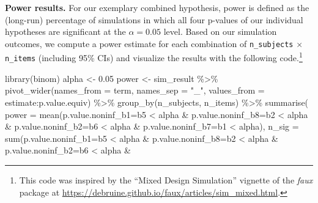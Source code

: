 \documentclass[
  man,
  floatsintext,
  longtable,
  a4paper,
  nolmodern,
  notxfonts,
  notimes,
  colorlinks=true,linkcolor=blue,citecolor=blue,urlcolor=blue]{apa7}
\newenvironment{Shaded}{\begin{snugshade}}{\end{snugshade}}
\newcommand{\AttributeTok}[1]{\textcolor[rgb]{0.40,0.45,0.13}{#1}}
\newcommand{\FloatTok}[1]{\textcolor[rgb]{0.68,0.00,0.00}{#1}}
\newcommand{\FunctionTok}[1]{\textcolor[rgb]{0.28,0.35,0.67}{#1}}
\newcommand{\NormalTok}[1]{\textcolor[rgb]{0.00,0.23,0.31}{#1}}
\newcommand{\OtherTok}[1]{\textcolor[rgb]{0.00,0.23,0.31}{#1}}
\newcommand{\SpecialCharTok}[1]{\textcolor[rgb]{0.37,0.37,0.37}{#1}}
\newcommand{\StringTok}[1]{\textcolor[rgb]{0.13,0.47,0.30}{#1}}
\begin{document}
\textbf{Power results.} For our exemplary combined hypothesis, power is
defined as the (long-run) percentage of simulations in which all four
p-values of our individual hypotheses are significant at the
\(\alpha = 0.05\) level. Based on our simulation outcomes, we compute a
power estimate for each combination of \texttt{n\_subjects} \(\times\)
\texttt{n\_items} (including 95\% CIs) and visualize the results with
the following code.\footnote{This code was inspired by the ``Mixed
  Design Simulation'' vignette of the \emph{faux} package at
  \url{https://debruine.github.io/faux/articles/sim_mixed.html}.}

\label{cell-fig-finalpwr}
\begin{Shaded}
\begin{Highlighting}[]
\FunctionTok{library}\NormalTok{(binom)}
\NormalTok{alpha }\OtherTok{\textless{}{-}} \FloatTok{0.05}
\NormalTok{power }\OtherTok{\textless{}{-}}\NormalTok{ sim\_result }\SpecialCharTok{\%\textgreater{}\%}
  \FunctionTok{pivot\_wider}\NormalTok{(}\AttributeTok{names\_from =}\NormalTok{ term, }\AttributeTok{names\_sep =} \StringTok{"\_"}\NormalTok{, }
    \AttributeTok{values\_from =}\NormalTok{ estimate}\SpecialCharTok{:}\NormalTok{p.value.equiv) }\SpecialCharTok{\%\textgreater{}\%}
  \FunctionTok{group\_by}\NormalTok{(n\_subjects, n\_items) }\SpecialCharTok{\%\textgreater{}\%} 
  \FunctionTok{summarise}\NormalTok{(}
    \AttributeTok{power =} \FunctionTok{mean}\NormalTok{(}\StringTok{\textasciigrave{}}\AttributeTok{p.value.noninf\_b1=b5}\StringTok{\textasciigrave{}} \SpecialCharTok{\textless{}}\NormalTok{ alpha }\SpecialCharTok{\&} 
        \StringTok{\textasciigrave{}}\AttributeTok{p.value.noninf\_b8=b2}\StringTok{\textasciigrave{}} \SpecialCharTok{\textless{}}\NormalTok{ alpha }\SpecialCharTok{\&} \StringTok{\textasciigrave{}}\AttributeTok{p.value.noninf\_b2=b6}\StringTok{\textasciigrave{}} \SpecialCharTok{\textless{}}\NormalTok{ alpha }\SpecialCharTok{\&} 
        \StringTok{\textasciigrave{}}\AttributeTok{p.value.noninf\_b7=b1}\StringTok{\textasciigrave{}} \SpecialCharTok{\textless{}}\NormalTok{ alpha), }
    \AttributeTok{n\_sig =} \FunctionTok{sum}\NormalTok{(}\StringTok{\textasciigrave{}}\AttributeTok{p.value.noninf\_b1=b5}\StringTok{\textasciigrave{}} \SpecialCharTok{\textless{}}\NormalTok{ alpha }\SpecialCharTok{\&} 
        \StringTok{\textasciigrave{}}\AttributeTok{p.value.noninf\_b8=b2}\StringTok{\textasciigrave{}} \SpecialCharTok{\textless{}}\NormalTok{ alpha }\SpecialCharTok{\&} \StringTok{\textasciigrave{}}\AttributeTok{p.value.noninf\_b2=b6}\StringTok{\textasciigrave{}} \SpecialCharTok{\textless{}}\NormalTok{ alpha }\SpecialCharTok{\&} 

\end{Highlighting}
\end{Shaded}
\end{document}
